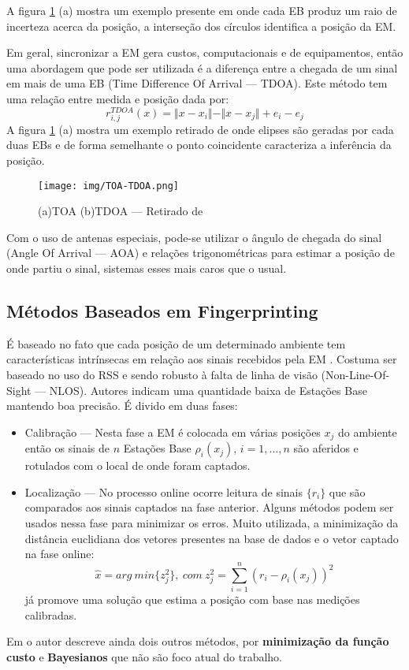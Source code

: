 A figura \ref{fig:TOA-TDOA} (a) mostra um exemplo presente em \cite{Gustafsson2005} onde cada EB produz um raio de incerteza acerca da posição, a interseção dos círculos identifica a posição da EM.

Em geral, sincronizar a EM gera custos, computacionais e de equipamentos, então uma abordagem que pode ser utilizada é a diferença entre a chegada de um sinal em mais de uma EB (Time Difference Of Arrival --- TDOA). Este método tem uma relação entre medida e posição dada por: $$r_{i,j}^{TDOA}(x)=\Vert x-x_{i}\Vert-\Vert x-x_{j}\Vert + e_{i}-e_{j}$$
A figura \ref{fig:TOA-TDOA} (a) mostra um exemplo retirado de \cite{Gustafsson2005} onde elipses são geradas por cada duas EBs e de forma semelhante o ponto coincidente caracteriza a inferência da posição.

\begin{figure}[ht]
\centering
\texttt{[image: img/TOA-TDOA.png]}
\caption{(a)TOA (b)TDOA\label{fig:TOA-TDOA} --- Retirado de \cite{Gustafsson2005}}
\end{figure}

Com o uso de antenas especiais, pode-se utilizar o ângulo de chegada do sinal (Angle Of Arrival --- AOA) e relações trigonométricas para estimar a posição de onde partiu o sinal, sistemas esses mais caros que o usual.

\subsection{Métodos Baseados em Fingerprinting}
É baseado no fato que cada posição de um determinado ambiente tem características intrínsecas em relação aos sinais recebidos pela EM \cite{Kaemarungsi2004}. Costuma ser baseado no uso do RSS e sendo robusto à falta de linha de visão (Non-Line-Of-Sight --- NLOS). Autores indicam uma quantidade baixa de Estações Base mantendo  boa precisão.
É divido em duas fases:

\begin{itemize}
\item Calibração --- Nesta fase a EM é colocada em várias posições ${x_{j}}$ do ambiente então os sinais de $n$ Estações Base ${\rho_{i}(x_{j})}$, $i=1,\dots,n$ são aferidos e rotulados com o local de onde foram captados.

\item Localização --- No processo online ocorre leitura de sinais $\lbrace r_{i}\rbrace$ que são comparados aos sinais captados na fase anterior. Alguns métodos podem ser usados nessa fase para minimizar os erros. Muito utilizada, a minimização da distância euclidiana dos vetores presentes na base de dados e o vetor captado na fase online:
$$\widehat{x}=arg\ min\lbrace z_{j}^{2}\rbrace,\ com\ z_{j}^{2}=\sum_{i=1}^{n}(r_{i}-\rho_{i}(x_{j}))^2 $$
já promove uma solução que estima a posição com base nas medições calibradas.
\end{itemize}

Em \cite{Seco2009} o autor descreve ainda dois outros métodos, por \textbf{minimização da função custo} e \textbf{Bayesianos} que não são foco atual do trabalho.
